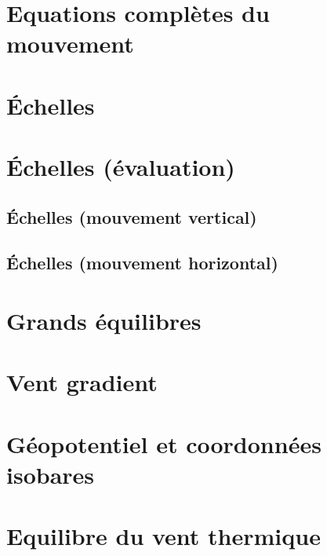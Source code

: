 \documentclass[a4paper,DIV16,10pt]{scrartcl}
\begin{document}
\section{Equations complètes du mouvement}


\newpage 
\section{\'Echelles}


\newpage 
\section{\'Echelles (évaluation)}

	\sk \subsection{\'Echelles (mouvement vertical)}
	

	\sk \subsection{\'Echelles (mouvement horizontal)}
	


\newpage
\section{Grands équilibres}


\newpage
\section{Vent gradient}


\newpage
\section{Géopotentiel et coordonnées isobares}


\newpage
\section{Equilibre du vent thermique}










%
\end{document}
